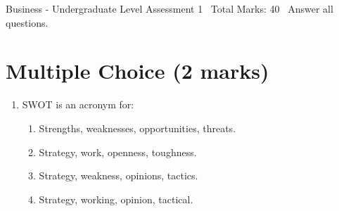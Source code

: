 \documentclass[12pt]{article}
\begin{document}
\begin{center}
Business - Undergraduate Level Assessment 1 \
Total Marks: 40 \
Answer all questions.
\end{center}

\section*{Multiple Choice (2 marks)}
\begin{enumerate}[label=\arabic*.]
\item SWOT is an acronym for:
\begin{enumerate}[label=(\alph*)]
    \item Strengths, weaknesses, opportunities, threats.
    \item Strategy, work, openness, toughness.
    \item Strategy, weakness, opinions, tactics.
    \item Strategy, working, opinion, tactical.
\end{enumerate}
\end{enumerate}
\end{document}
